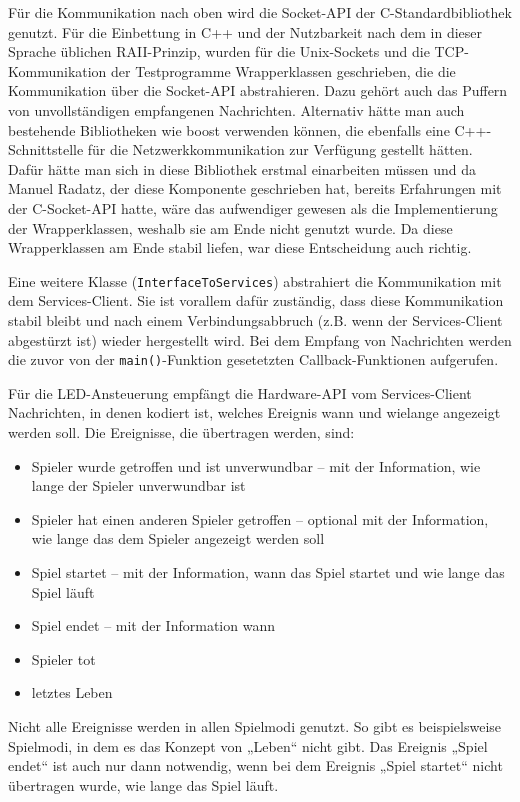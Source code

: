 Für die Kommunikation nach oben wird die Socket-API der C-Standardbibliothek genutzt.
Für die Einbettung in C++ und der Nutzbarkeit nach dem in dieser Sprache üblichen RAII-Prinzip,
wurden für die Unix-Sockets und die TCP-Kommunikation der Testprogramme Wrapperklassen geschrieben,
die die Kommunikation über die Socket-API abstrahieren.
Dazu gehört auch das Puffern von unvollständigen empfangenen Nachrichten.
Alternativ hätte man auch bestehende Bibliotheken wie boost verwenden können, die ebenfalls eine
C++-Schnittstelle für die Netzwerkkommunikation zur Verfügung gestellt hätten.
Dafür hätte man sich in diese Bibliothek erstmal einarbeiten müssen und da Manuel Radatz, der diese
Komponente geschrieben hat, bereits Erfahrungen mit der C-Socket-API hatte, wäre das aufwendiger
gewesen als die Implementierung der Wrapperklassen, weshalb sie am Ende nicht genutzt wurde.
Da diese Wrapperklassen am Ende stabil liefen, war diese Entscheidung auch richtig.

Eine weitere Klasse (\texttt{InterfaceToServices}) abstrahiert die Kommunikation mit dem
Services-Client.
Sie ist vorallem dafür zuständig, dass diese Kommunikation stabil bleibt und nach einem
Verbindungsabbruch (z.B. wenn der Services-Client abgestürzt ist) wieder hergestellt wird.
Bei dem Empfang von Nachrichten werden die zuvor von der \texttt{main()}-Funktion gesetetzten
Callback-Funktionen aufgerufen.

Für die LED-Ansteuerung empfängt die Hardware-API vom Services-Client Nachrichten, in denen kodiert
ist, welches Ereignis wann und wielange angezeigt werden soll.
Die Ereignisse, die übertragen werden, sind:
\begin{itemize}
  \item
    Spieler wurde getroffen und ist unverwundbar – mit der Information, wie lange der Spieler
    unverwundbar ist
  \item
    Spieler hat einen anderen Spieler getroffen – optional mit der Information, wie lange das dem
    Spieler angezeigt werden soll
  \item
    Spiel startet – mit der Information, wann das Spiel startet und wie lange das Spiel läuft
  \item
    Spiel endet – mit der Information wann
  \item
    Spieler tot
  \item
    letztes Leben
\end{itemize}
Nicht alle Ereignisse werden in allen Spielmodi genutzt.
So gibt es beispielsweise Spielmodi, in dem es das Konzept von „Leben“ nicht gibt.
Das Ereignis „Spiel endet“ ist auch nur dann notwendig, wenn bei dem Ereignis „Spiel startet“ nicht
übertragen wurde, wie lange das Spiel läuft.

